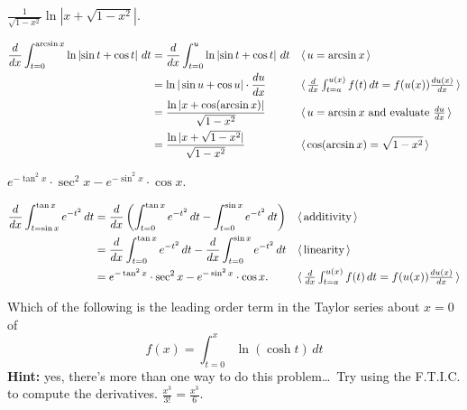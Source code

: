 


    {$ \frac{1}{\sqrt{1-x^2}}\ln \left| x + \sqrt{1-x^2} \right| $.}
    
    \begin{align*}
    \frac{d}{dx} \int_{t=0}^{\arcsin x} \ln \left| \sin t + \cos t \right| \, dt
        &= \frac{d}{dx} \int_{t=0}^{u} \ln \left| \sin t + \cos t
            \right| \, dt
            && \langle \, \text{$ u = \arcsin x $} \, \rangle \\
        &= \ln |\sin u + \cos u| \cdot \frac{du}{dx}
            && \langle \, \text{$\textstyle \frac{d}{dx} \int_{t=a}^{u(x)} f(t) \,dt =
                        f(u(x)) \frac{du(x)}{dx} $} \, \rangle \\
        &= \frac{\ln |x + \cos(\arcsin x)|}{\sqrt{1-x^2}}
            && \langle \, \text{$ u = \arcsin x $ and evaluate $ \tfrac{du}{dx} $} \, \rangle \\
        &= \frac{\ln |x + \sqrt{1-x^2}|}{\sqrt{1-x^2}}
            && \langle \, \text{$ \cos(\arcsin x) = \sqrt{1-x^2} $} \, \rangle
    \end{align*}
    
    {$ e^{-\tan^2 x} \cdot \sec^2 x - e^{-\sin^2 x} \cdot \cos x $.}
    
    \begin{align*}
    \frac{d}{dx} \int_{t=\sin x}^{\tan x} e^{-t^2} \, dt
        &= \frac{d}{dx} \left( \int_{t=0}^{\tan x} e^{-t^2} \, dt -
            \int_{t=0}^{\sin x} e^{-t^2} \, dt \right)
            && \langle \, \text{additivity} \, \rangle \\
        &= \frac{d}{dx} \int_{t=0}^{\tan x} e^{-t^2} \, dt
            - \frac{d}{dx} \int_{t=0}^{\sin x} e^{-t^2} \, dt
            && \langle \, \text{linearity} \, \rangle \\
        &= e^{-\tan^2 x} \cdot \sec^2 x - e^{-\sin^2 x} \cdot \cos x.
            && \langle \, \text{$\textstyle \frac{d}{dx} \int_{t=a}^{u(x)} f(t) \,dt =
                f(u(x)) \frac{du(x)}{dx} $} \, \rangle \\
    \end{align*}
    
    {Which of the following is the leading order term in the Taylor series about
    $ x=0 $ of
        \[ f(x) = \int_{t=0}^x\ln(\cosh t) \, dt \]
    \textbf{Hint:} yes, there's more than one way to do this problem\dots\ Try
    using the F.T.I.C. to compute the derivatives.}
    {$ \frac{x^3}{3!} = \frac{x^3}6 $.}
    
